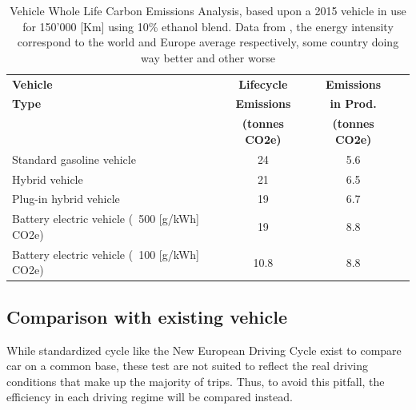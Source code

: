 \begin{table}[h]
    \centering
    \begin{tabular}{lccc}
        \toprule
        \textbf{Vehicle} & \textbf{Lifecycle} & \textbf{Emissions} \\
        \textbf{Type} & \textbf{Emissions} & \textbf{in Prod.} \\
        & \textbf{(tonnes CO2e)} & \textbf{(tonnes CO2e)} \\
        \midrule
        Standard gasoline vehicle & 24  & 5.6 \\
        Hybrid vehicle            & 21  & 6.5 \\
        Plug-in hybrid vehicle    & 19  & 6.7 \\
        Battery electric vehicle (~500 [g/kWh] CO2e)  & 19  & 8.8 \\
        Battery electric vehicle (~100 [g/kWh] CO2e)  & 10.8 & 8.8 \\
        \bottomrule
    \end{tabular}
    \caption{Vehicle Whole Life Carbon Emissions Analysis, based upon a 2015 vehicle in use for 150'000 [Km] using 10\% ethanol blend. Data from \cite{noauthor_zemo2025lifecycle_nodate}, the energy intensity correspond to the world and Europe average respectively, some country doing way better and other worse \cite{noauthor_power_nodate}}
    \label{tab:carbon_emissions}
\end{table}

\newpage

\subsection{Comparison with existing vehicle}

While standardized cycle like the New European Driving Cycle exist to compare car on a common base, these test are not suited to reflect the real driving conditions that make up the majority of trips.\cite{suppportinganalysisonco2emmission} Thus, to avoid this pitfall, the efficiency in each driving regime will be compared instead.

